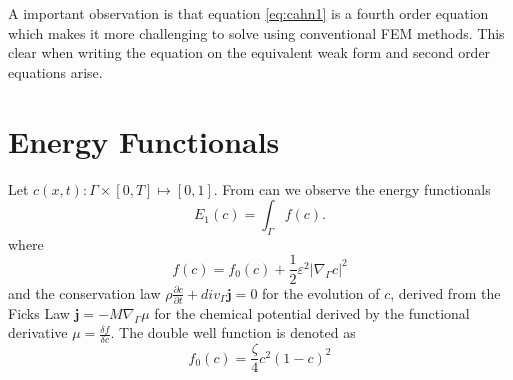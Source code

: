 A important observation is that equation \eqref{eq:cahn1} is a fourth order equation which makes it more challenging to
solve using conventional FEM methods. This clear when writing the equation on the equivalent weak form and second order
equations arise.


\newpage
\section{Energy Functionals}%
\label{sec:energy_functionals}
Let $c\left( x,t \right)  : \Gamma \times [0,T] \mapsto [0,1] $. From \cite{yushutin19} can we observe the energy functionals
\begin{equation*}
   E _{1}(c) = \int_\Gamma f(c)
.\end{equation*}
where \[
f\left( c \right) = f_{0}\left( c \right) + \frac{1}{2}\varepsilon ^{2} \left\lvert \nabla _{\Gamma } c \right\rvert ^{2}
\]
and the conservation law  $\rho \frac{\partial c}{\partial  t}  + div_{\Gamma } \mathbf{j} = 0$ for the evolution of  $c $, derived from the Ficks Law $\mathbf{j} = - M \nabla _{\Gamma } \mu $ for the chemical potential derived by the functional derivative $\mu = \frac{\delta
f}{\delta c} $. The double well function is denoted as \[
f_{0}\left( c \right)  = \frac{\zeta}{4} c^2(1- c)^2
\]






\newpage

